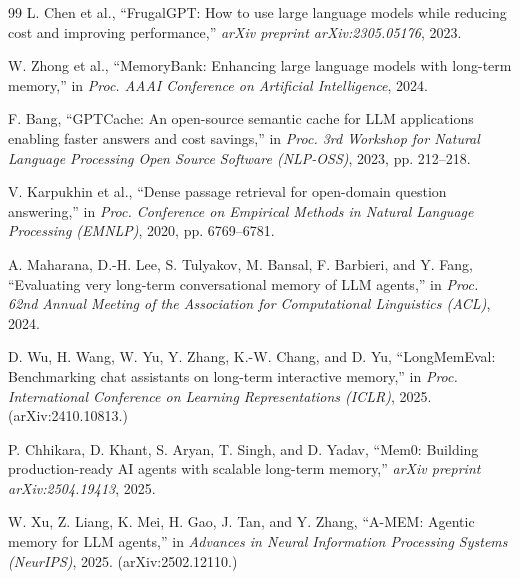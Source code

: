 \documentclass[conference]{IEEEtran}
\begin{document}
\begin{thebibliography}{99}
L. Chen et al., ``FrugalGPT: How to use large language models while reducing cost and improving performance,'' \textit{arXiv preprint arXiv:2305.05176}, 2023.

W. Zhong et al., ``MemoryBank: Enhancing large language models with long-term memory,'' in \textit{Proc. AAAI Conference on Artificial Intelligence}, 2024.

F. Bang, ``GPTCache: An open-source semantic cache for LLM applications enabling faster answers and cost savings,'' in \textit{Proc. 3rd Workshop for Natural Language Processing Open Source Software (NLP-OSS)}, 2023, pp. 212--218.

V. Karpukhin et al., ``Dense passage retrieval for open-domain question answering,'' in \textit{Proc. Conference on Empirical Methods in Natural Language Processing (EMNLP)}, 2020, pp. 6769--6781.

A. Maharana, D.-H. Lee, S. Tulyakov, M. Bansal, F. Barbieri, and Y. Fang, ``Evaluating very long-term conversational memory of LLM agents,'' in \textit{Proc. 62nd Annual Meeting of the Association for Computational Linguistics (ACL)}, 2024.

D. Wu, H. Wang, W. Yu, Y. Zhang, K.-W. Chang, and D. Yu, ``LongMemEval: Benchmarking chat assistants on long-term interactive memory,'' in \textit{Proc. International Conference on Learning Representations (ICLR)}, 2025. (arXiv:2410.10813.)

P. Chhikara, D. Khant, S. Aryan, T. Singh, and D. Yadav, ``Mem0: Building production-ready AI agents with scalable long-term memory,'' \textit{arXiv preprint arXiv:2504.19413}, 2025.

W. Xu, Z. Liang, K. Mei, H. Gao, J. Tan, and Y. Zhang, ``A-MEM: Agentic memory for LLM agents,'' in \textit{Advances in Neural Information Processing Systems (NeurIPS)}, 2025. (arXiv:2502.12110.)

\end{thebibliography}
\end{document}
